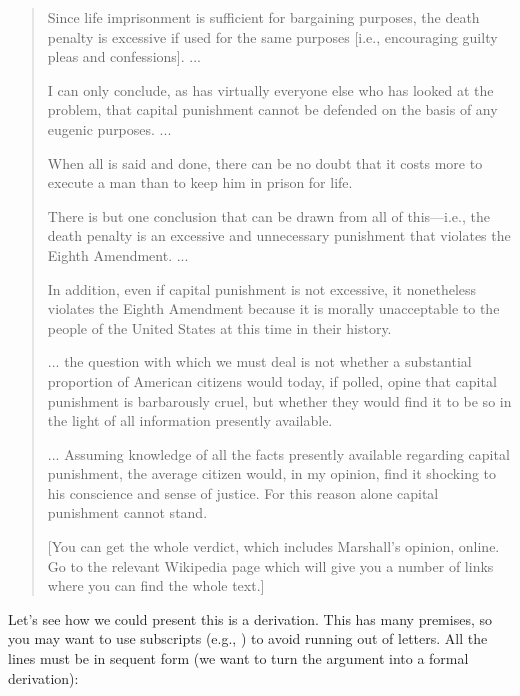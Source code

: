 \begin{quote}
Since life imprisonment is sufficient for bargaining purposes, the death penalty 
is excessive if used for the same purposes [i.e., encouraging guilty pleas and 
confessions].
...

 I can only conclude, as has virtually everyone else who has looked at the 
 problem, that capital punishment cannot be defended on the basis of any eugenic 
 purposes.
 ...

 When all is said and done, there can be no doubt that it costs more to execute 
 a man than to keep him in prison for life.

 There is but one conclusion that can be drawn from all of this—i.e., the death 
 penalty is an excessive and unnecessary punishment that violates the Eighth 
 Amendment. ... 


 In addition, even if capital punishment is not excessive, it nonetheless 
 violates the Eighth Amendment because it is morally unacceptable to the people 
 of the United States at this time in their history.

 ... the question with which we must deal is not whether a substantial 
 proportion of American citizens would today, if polled, opine that capital 
 punishment is barbarously cruel, but whether they would find it to be so in the 
 light of all information presently available.

... Assuming knowledge of all the facts presently available regarding capital 
punishment, the average citizen would, in my opinion, find it shocking to his 
conscience and sense of justice. For this reason alone capital punishment cannot 
stand.
 
 
 [You can get the whole verdict, which includes Marshall's opinion, online. Go 
 to the relevant Wikipedia page which will give you a number of links where you 
 can find the whole text.]

\end{quote}

Let's see how we could present this is a derivation. This has many premises, so 
you may want to use subscripts (e.g., ) to avoid running 
out of letters. All the lines must be in sequent form (we want to turn the 
argument into a formal derivation):

